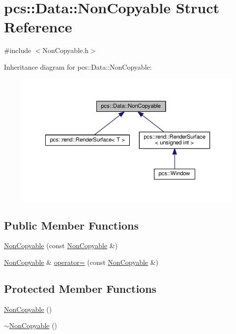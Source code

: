 \hypertarget{structpcs_1_1Data_1_1NonCopyable}{}\section{pcs\+:\+:Data\+:\+:Non\+Copyable Struct Reference}
\label{structpcs_1_1Data_1_1NonCopyable}


{\ttfamily \#include $<$Non\+Copyable.\+h$>$}



Inheritance diagram for pcs\+:\+:Data\+:\+:Non\+Copyable\+:\nopagebreak
\begin{figure}[H]
\begin{center}
\leavevmode
\includegraphics[width=350pt]{structpcs_1_1Data_1_1NonCopyable__inherit__graph}
\end{center}
\end{figure}
\subsection*{Public Member Functions}
\begin{DoxyCompactItemize}
\item 
\hyperlink{structpcs_1_1Data_1_1NonCopyable_ac9cde01db2d5ba115c033ae5ce13a11f}{Non\+Copyable} (const \hyperlink{structpcs_1_1Data_1_1NonCopyable}{Non\+Copyable} \&)
\item 
\hyperlink{structpcs_1_1Data_1_1NonCopyable}{Non\+Copyable} \& \hyperlink{structpcs_1_1Data_1_1NonCopyable_a3fec6abd7a92cc27e19fe7361b3f0c24}{operator=} (const \hyperlink{structpcs_1_1Data_1_1NonCopyable}{Non\+Copyable} \&)
\end{DoxyCompactItemize}
\subsection*{Protected Member Functions}
\begin{DoxyCompactItemize}
\item 
\hyperlink{structpcs_1_1Data_1_1NonCopyable_aad220ecfe40ad6fa4f57450db4589750}{Non\+Copyable} ()
\item 
\hyperlink{structpcs_1_1Data_1_1NonCopyable_aaaf234adb2a742fee93e4eee336c1dcc}{$\sim$\+Non\+Copyable} ()
\end{DoxyCompactItemize}


